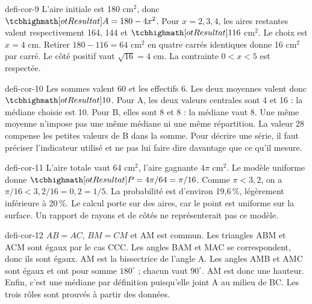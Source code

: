 \begin{blocEdition}{defi-cor-9}
L’aire initiale est 180 cm$^2$, donc $\res{A=180-4x^2}$.
Pour $x=2,3,4$, les aires restantes valent respectivement 164, 144 et $\res{116}$ cm$^2$. Le choix est $x=4$ cm.
Retirer $180-116=64$ cm$^2$ en quatre carrés identiques donne 16 cm$^2$ par carré. Le côté positif vaut $\sqrt{16}=4$ cm. La contrainte $0<x<5$ est respectée.\label{fig-defi-cor-9}

\end{blocEdition}
\begin{blocEdition}{defi-cor-10}
Les sommes valent 60 et les effectifs 6. Les deux moyennes valent donc $\res{10}$.
Pour A, les deux valeurs centrales sont 4 et 16 : la médiane choisie est 10. Pour B, elles sont 8 et 8 : la médiane vaut 8.
Une même moyenne n’impose pas une même médiane ni une même répartition. La valeur 28 compense les petites valeurs de B dans la somme. Pour décrire une série, il faut préciser l’indicateur utilisé et ne pas lui faire dire davantage que ce qu’il mesure.
\end{blocEdition}
\begin{blocEdition}{defi-cor-11}
L’aire totale vaut 64 cm$^2$, l’aire gagnante $4\pi$ cm$^2$. Le modèle uniforme donne $\res{P=4\pi/64=\pi/16}$.
Comme $\pi<3{,}2$, on a $\pi/16<3{,}2/16=0{,}2=1/5$.
La probabilité est d’environ 19,6\,\%, légèrement inférieure à 20\,\%. Le calcul porte sur des aires, car le point est uniforme sur la surface. Un rapport de rayons et de côtés ne représenterait pas ce modèle.\label{fig-defi-cor-11}

\end{blocEdition}
\begin{blocEdition}{defi-cor-12}
$AB=AC$, $BM=CM$ et AM est commun. Les triangles ABM et ACM sont égaux par le cas CCC.
Les angles BAM et MAC se correspondent, donc ils sont égaux. AM est la bissectrice de l’angle A.
Les angles AMB et AMC sont égaux et ont pour somme $180^\circ$ ; chacun vaut $90^\circ$. AM est donc une hauteur. Enfin, c’est une médiane par définition puisqu’elle joint A au milieu de BC. Les trois rôles sont prouvés à partir des données.\label{fig-defi-cor-12}

\end{blocEdition}
